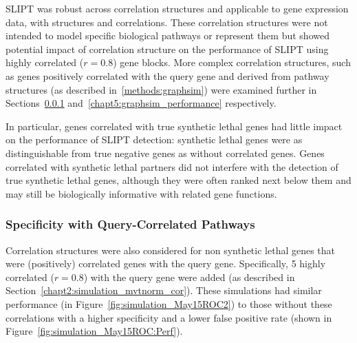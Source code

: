\gls{SLIPT} was robust across correlation structures and applicable to gene expression data, with  structures and correlations. These correlation structures were not intended to model specific biological pathways or represent them but showed potential impact of correlation structure on the performance of \gls{SLIPT} using highly correlated ($r = 0.8$) gene blocks. More complex correlation structures, such as genes positively correlated with the query gene and derived from pathway  structures (as described in~\ref{methods:graphsim}) were examined further in Sections~\ref{chapt2:simulation_mvtnorm_query_cor} and~\ref{chapt5:graphsim_performance} respectively.

In particular, genes correlated with true \gls{synthetic lethal} genes had little impact on the performance of \gls{SLIPT} detection: \gls{synthetic lethal} genes were as distinguishable from true negative genes as without correlated genes. Genes correlated with \gls{synthetic lethal} partners did not interfere with the detection of true \gls{synthetic lethal} genes, although they were often ranked next below them and may still be biologically informative with related gene functions.


\subsubsection{Specificity with Query-Correlated Pathways}  \label{chapt2:simulation_mvtnorm_query_cor}

Correlation structures were also considered for non synthetic lethal genes that were (positively) correlated genes with the query gene. Specifically, 5 highly correlated ($r = 0.8$) with the query gene were added (as described in Section~\ref{chapt2:simulation_mvtnorm_cor}). These simulations had similar performance (in Figure~\ref{fig:simulation_May15ROC2}) to those without these correlations with a higher specificity and a lower false positive rate (shown in Figure~\ref{fig:simulation_May15ROC:Perf}).


\iffalse
\begin{figure*}[!htbp]
  \begin{center}
  \resizebox{0.5 \textwidth}{!}{
  \fbox{
    \texttt{[image: \{"SL\_Model\_Test\_Graph\_10K\_Graph1\_ROC\_Compare\_Mvtn(Apry)\_v\_Cor(Mayxy)\_Full"]}}
   }
   }
   \end{center}
   \caption[Comparison of performance for query correlations]{\small \textbf{Comparison of performance for query correlations.} Multivariate simulation of \glspl{synthetic lethal} with correlation structure (in colour) clearly has lower performance than simulation including query correlations (in greyscale) across parameters. The query correlation simulation shows predictive potential for \gls{SLIPT} even with many underlying \gls{synthetic lethal} partners as positively correlated genes are distinguished robustly.}
\label{fig:mvtnorm_query_cor_compare}
\end{figure*}
\fi

